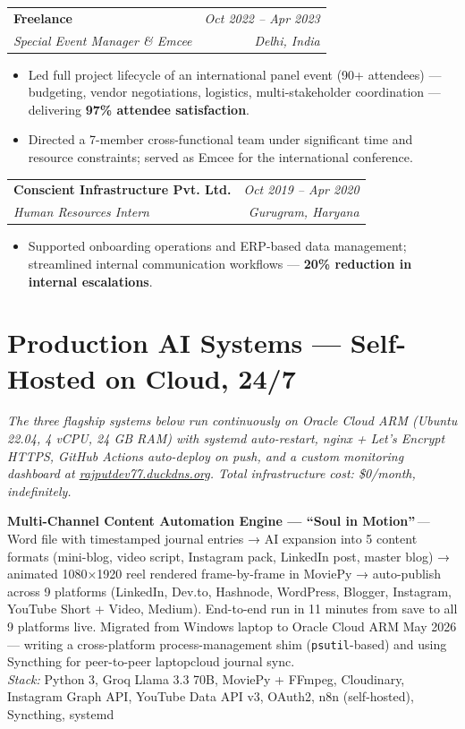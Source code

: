 \documentclass[a4paper,11pt]{article}
\makeatletter
\newcommand{\experience}[4]{%
  \begin{tabularx}{\linewidth}{@{}X r@{}}
    \textbf{#1} & \textit{\color{muted}#3} \\
    \textit{#2} & \textit{\color{muted}#4} \\
  \end{tabularx}\vspace{3pt}%
}
\newcommand{\project}[3]{%
  \textbf{#1}\,{\color{muted}---}\,#2\\[1pt]%
  {\small\color{muted}\textit{Stack:} #3}\vspace{8pt}%
}
\makeatother
\begin{document}
\vspace{8pt}

\experience{Freelance}{Special Event Manager \& Emcee}{Oct 2022 -- Apr 2023}{Delhi, India}
\begin{itemize}
  \item Led full project lifecycle of an international panel event (90+ attendees) --- budgeting, vendor negotiations, logistics, multi-stakeholder coordination --- delivering \textbf{97\% attendee satisfaction}.
  \item Directed a 7-member cross-functional team under significant time and resource constraints; served as Emcee for the international conference.
\end{itemize}

\vspace{8pt}

\experience{Conscient Infrastructure Pvt. Ltd.}{Human Resources Intern}{Oct 2019 -- Apr 2020}{Gurugram, Haryana}
\begin{itemize}
  \item Supported onboarding operations and ERP-based data management; streamlined internal communication workflows --- \textbf{20\% reduction in internal escalations}.
\end{itemize}

\section*{Production AI Systems --- Self-Hosted on Cloud, 24/7}

\textit{The three flagship systems below run continuously on Oracle Cloud ARM (Ubuntu 22.04, 4 vCPU, 24 GB RAM) with systemd auto-restart, nginx + Let's Encrypt HTTPS, GitHub Actions auto-deploy on push, and a custom monitoring dashboard at \href{https://rajputdev77.duckdns.org}{\color{accent}rajputdev77.duckdns.org}. Total infrastructure cost: \$0/month, indefinitely.}

\vspace{8pt}

\project{Multi-Channel Content Automation Engine --- ``Soul in Motion''}{Word file with timestamped journal entries → AI expansion into 5 content formats (mini-blog, video script, Instagram pack, LinkedIn post, master blog) → animated 1080×1920 reel rendered frame-by-frame in MoviePy → auto-publish across 9 platforms (LinkedIn, Dev.to, Hashnode, WordPress, Blogger, Instagram, YouTube Short + Video, Medium). End-to-end run in 11 minutes from save to all 9 platforms live. Migrated from Windows laptop to Oracle Cloud ARM May 2026 --- writing a cross-platform process-management shim (\texttt{psutil}-based) and using Syncthing for peer-to-peer laptop\textrightarrow cloud journal sync.}{Python 3, Groq Llama 3.3 70B, MoviePy + FFmpeg, Cloudinary, Instagram Graph API, YouTube Data API v3, OAuth2, n8n (self-hosted), Syncthing, systemd}
\vspace{8pt}\\
\end{document}
